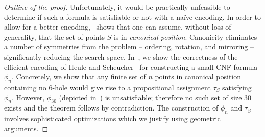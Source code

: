\begin{proof}[Outline of the proof]
Unfortunately, it would be practically unfeasible to determine if such a formula is satisfiable or not with a naïve encoding.
In order to allow for a better encoding,~ shows that one can assume, without loss of generality, that the set of points $S$ is in \emph{canonical position}.
Canonicity eliminates a number of symmetries from the problem --
ordering, rotation, and mirroring --
significantly reducing the search space.
In~, we show the correctness of the efficient encoding of Heule and Scheucher~\cite{emptyHexagonNumber} for constructing
a small CNF formula $\phi_n$. Concretely, we show that any finite set of $n$ points in canonical position
containing no $6$-hole
would give rise to a propositional assignment $\tau_S$ satisfying $\phi_n$.
However, $\phi_{30}$ (depicted in~) is unsatisfiable;
therefore no such set of size $30$ exists
and the theorem follows by contradiction.
The construction of $\phi_n$ and $\tau_S$
involves sophisticated optimizations
which we justify using geometric arguments.
\end{proof}



